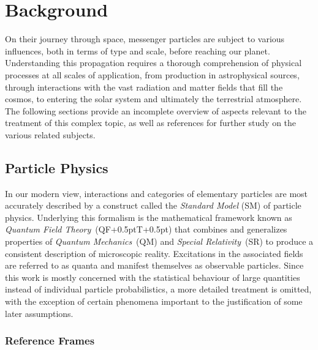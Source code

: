 \chapter{Background}
\label{ch:background}

On their journey through space, messenger particles are subject to various influences, both in terms of type and scale,
before reaching our planet. Understanding this propagation requires a thorough comprehension of physical processes at all
scales of application, from production in astrophysical sources, through interactions with the vast radiation and matter
fields that fill the cosmos, to entering the solar system and ultimately the terrestrial atmosphere. The following sections
provide an incomplete overview of aspects relevant to the treatment of this complex topic, as well as references for further
study on the various related subjects.



\section{Particle Physics}
\label{sec:particle}

In our modern view, interactions and categories of elementary particles are most accurately described by a construct called the
\emph{Standard Model} (SM) of particle physics. Underlying this formalism is the mathematical framework known as
\emph{Quantum Field Theory}~(QF{\kern+0.5pt}T{\kern+0.5pt}) that combines and generalizes properties of
\emph{Quantum Mechanics}~(QM) and \emph{Special Relativity}~(SR) to produce a consistent description of microscopic reality.
Excitations in the associated fields are referred to as quanta and manifest themselves as observable particles.
Since this work is mostly concerned with the statistical behaviour of large quantities instead of individual particle probabilistics,
a more detailed treatment is omitted, with the exception of certain phenomena important to the justification of some later assumptions.



\subsection{Reference Frames}
\label{sub:frames}

